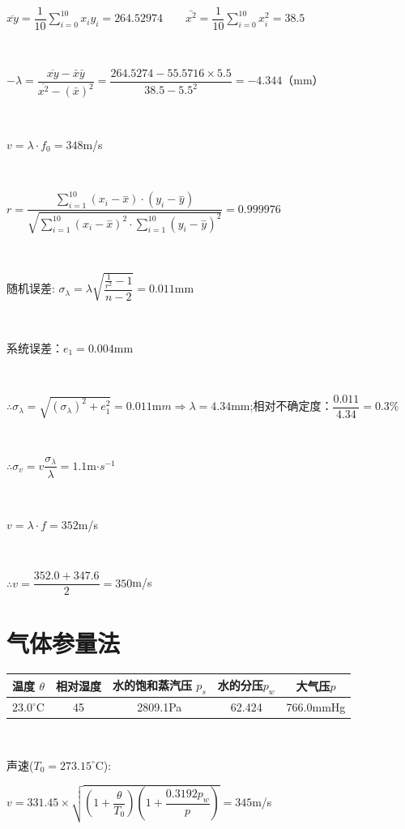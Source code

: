 \documentclass[1pt]{article}
\begin{document}
\centerline{$\overline{xy}=\dfrac{1}{10} \sum_{i=0}^{10} x_iy_i=264.52974
\qquad \bar{x^2}=\dfrac{1}{10} \sum_{i=0}^{10} x_i^2=38.5$}\\
\centerline{$-\lambda = \dfrac{\overline{xy}-\bar{x}\bar{y}}{\overline{x^2}-(\bar{x})^2}=\dfrac{264.5274-55.5716\times5.5}{38.5-5.5^2}=-4.344$（mm）}\\
\centerline{$v=\lambda \cdot f_0=348$m/s}\\
\centerline{$ r = \dfrac{\sum _{i=1}^{10}(x_{i} - \stackrel{-}{x})\cdot(y_{i} - \stackrel{-}{y})}{\sqrt{\sum _{i=1}^{10}(x_{i} - \stackrel{-}{x})^{2} \cdot \sum _{i=1}^{10}(y_{i} - \stackrel{-}{y})^{2}}} = 0.999976$}\\
\centerline{随机误差: $\sigma_{\lambda} =  \lambda \sqrt{\dfrac{\frac{1}{r^{2}}-1}{n-2}}=0.011$mm}\\
\centerline{系统误差：$e_1=0.004$mm}\\
\centerline{$\therefore \sigma_\lambda = \sqrt{(\sigma_{\lambda})^2+e_1^2}=0.011$m$m\Rightarrow \lambda = 4.34$mm;\qquad 相对不确定度：$\dfrac{0.011}{4.34}=0.3\%$}\\
\centerline{$\therefore \sigma_v = v \dfrac{\sigma_\lambda}{\lambda} =1.1 $m$\cdot s^{-1} $}\\
\centerline{$v=\lambda\cdot f = 352 $m/s}\\
\centerline{$\therefore v=\dfrac{352.0+347.6}{2}=350$m/s}





\section{气体参量法}
	\begin{center}
	\begin{tabular}{|c|c|c|c|c|}
	\hline
	温度 $\theta$ &相对湿度&水的饱和蒸汽压 $p_s$ &水的分压$p_w$ & 大气压$p$ \\
	\hline
	$23.0^{\circ}$C&45&2809.1Pa&62.424&766.0mmHg\\
	\hline
	\end{tabular}\\
	\end{center}
	\qquad \qquad\qquad\qquad\qquad\qquad\qquad\qquad 声速($T_0=273.15^{\circ}$C):
	\begin{center}
	$v=331.45\times \sqrt{(1+\dfrac{\theta}{T_0})(1+\dfrac{0.3192p_w}{p})}=345$m/s
	\end{center}
\end{document}
